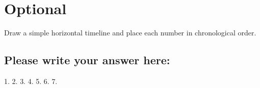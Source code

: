 \documentclass[12pt]{article}
\newcommand{\fillin}[1]{\uline{\hspace{#1}}}
\begin{document}
\section*{Optional}
Draw a simple horizontal timeline and place each number in chronological order.

\subsection*{Please write your answer here:}
1. \fillin{3cm}  
2. \fillin{3cm}  
3. \fillin{3cm}  
4. \fillin{3cm}  
5. \fillin{3cm}  
6. \fillin{3cm}  
7. \fillin{3cm}
\end{document}
